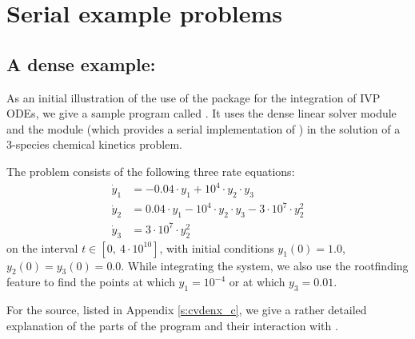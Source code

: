 \section{Serial example problems}\label{s:ex_serial}

\subsection{A dense example: }\label{ss:cvdenx}

As an initial illustration of the use of the {\cvode} package for the
integration of IVP ODEs, we give a sample program called .
It uses the {\cvode} dense linear solver module {\cvdense} 
and the {\nvecs} module (which provides a serial implementation of {\nvector})
in the solution of a 3-species chemical kinetics problem.

The problem consists of the following three rate equations:
\vspace*{-.08in}
\begin{equation}
  \begin{split}
    \dot{y}_1 &= -0.04 \cdot y_1 + 10^4 \cdot y_2 \cdot y_3 \\
    \dot{y}_2 &=  0.04 \cdot y_1 - 10^4 \cdot y_2 \cdot y_3
                                  - 3 \cdot 10^7 \cdot y_2^2 \\
    \dot{y}_3 &=  3 \cdot 10^7 \cdot y_2^2
  \end{split} 
\end{equation}
on the interval $t \in [0, ~4 \cdot 10^{10}]$, with initial conditions
$y_1(0) = 1.0$, $y_2(0) = y_3(0) = 0.0$.
While integrating the system, we also use the rootfinding
feature to find the points at which $y_1 = 10^{-4}$ or at which
$y_3 = 0.01$.

For the source, listed in Appendix \ref{s:cvdenx_c}, we give a rather detailed
explanation of the parts of the program and their interaction with {\cvode}.


